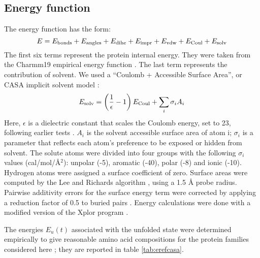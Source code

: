 \subsection{Energy function}
The energy function has the form:
\begin{equation} \label{eq:energy}
E = E_{\rm bonds} + E_{\rm angles} + E_{\rm dihe} + E_{\rm impr} + E_{\rm vdw} + E_{\rm Coul} + E_{\rm solv} 
\end{equation}
The first six terms represent the protein internal energy. They were taken from the Charmm19 empirical energy function \cite{Brooks09}. The last term represents the contribution of solvent. We used a ``Coulomb + Accessible Surface Area'', or CASA implicit solvent model \cite{Lopes07,Schmidt08b}:
\begin{equation} \label{eq:casa}
E_{\rm solv} = \left( \frac{1}{\epsilon} -1 \right) E_{\rm Coul} + \sum_i \sigma_i A_i
\end{equation}
Here, $\epsilon$ is a dielectric constant that scales the Coulomb energy, set to 23, following earlier tests \cite{Schmidt08b}. $A_i$ is the solvent accessible surface area of atom i; $\sigma_i$ is a parameter that reflects each atom's preference to be exposed or hidden from solvent. The solute atoms were divided into four groups with the following $\sigma_i$ values (cal/mol/\AA$^2$): unpolar (-5), aromatic (-40), polar (-8) and ionic (-10). Hydrogen atoms were assigned a surface coefficient of zero. Surface areas were computed by the Lee and Richards algorithm \cite{Lee71}, using a 1.5 {\AA} probe radius. Pairwise additivity errors for the surface energy term were corrected by applying a reduction factor of 0.5 to buried pairs \cite{Street98,Lopes07}. Energy calculations were done with a modified version of the Xplor program \cite{Xplor,Simonson13b}.

The energies $E_u(t)$ associated with the unfolded state were determined empirically to give reasonable amino acid compositions for the protein families considered here \cite{Schmidt08}; they are reported in table \ref{tab:erefcasa}.


